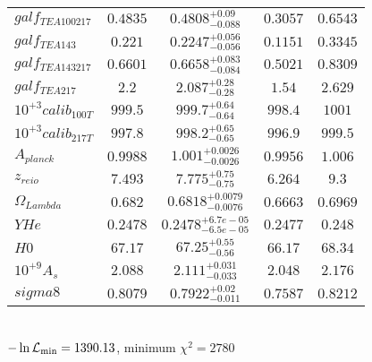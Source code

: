 \begin{tabular}{|l|c|c|c|c|}
$galf_{TE A 100 217 }$ &$0.4835$ & $0.4808_{-0.088}^{+0.09}$ & $0.3057$ & $0.6543$ \\ 
$galf_{TE A 143 }$ &$0.221$ & $0.2247_{-0.056}^{+0.056}$ & $0.1151$ & $0.3345$ \\ 
$galf_{TE A 143 217 }$ &$0.6601$ & $0.6658_{-0.084}^{+0.083}$ & $0.5021$ & $0.8309$ \\ 
$galf_{TE A 217 }$ &$2.2$ & $2.087_{-0.28}^{+0.28}$ & $1.54$ & $2.629$ \\ 
$10^{+3}calib_{100T }$ &$999.5$ & $999.7_{-0.64}^{+0.64}$ & $998.4$ & $1001$ \\ 
$10^{+3}calib_{217T }$ &$997.8$ & $998.2_{-0.65}^{+0.65}$ & $996.9$ & $999.5$ \\ 
$A_{planck }$ &$0.9988$ & $1.001_{-0.0026}^{+0.0026}$ & $0.9956$ & $1.006$ \\ 
$z_{reio }$ &$7.493$ & $7.775_{-0.75}^{+0.75}$ & $6.264$ & $9.3$ \\ 
$\Omega{}_{Lambda }$ &$0.682$ & $0.6818_{-0.0076}^{+0.0079}$ & $0.6663$ & $0.6969$ \\ 
$YHe$ &$0.2478$ & $0.2478_{-6.5e-05}^{+6.7e-05}$ & $0.2477$ & $0.248$ \\ 
$H0$ &$67.17$ & $67.25_{-0.56}^{+0.55}$ & $66.17$ & $68.34$ \\ 
$10^{+9}A_{s }$ &$2.088$ & $2.111_{-0.033}^{+0.031}$ & $2.048$ & $2.176$ \\ 
$sigma8$ &$0.8079$ & $0.7922_{-0.011}^{+0.02}$ & $0.7587$ & $0.8212$ \\ 
\hline 
 \end{tabular} \\ 
$-\ln{\cal L}_\mathrm{min} =1390.13$, minimum $\chi^2=2780$ \\ 
